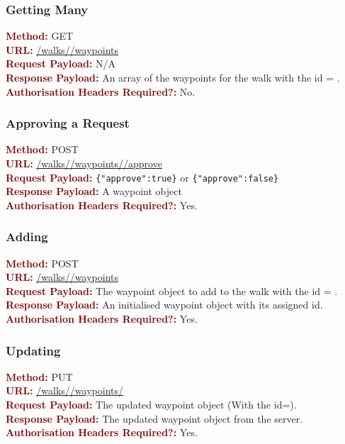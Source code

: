 \documentclass[11pt,a4paper]{report}
\begin{document}
\subsubsection{Getting Many}
\textbf{\textcolor{Maroon}{Method:}} GET\\
\textbf{\textcolor{Maroon}{URL:}} \url{/walks/}\url{/waypoints}\\
\textbf{\textcolor{Maroon}{Request Payload:}} N/A\\
\textbf{\textcolor{Maroon}{Response Payload:}} An array of the waypoints for the walk with the id = .\\
\textbf{\textcolor{Maroon}{Authorisation Headers Required?:}} No.

\subsubsection{Approving a Request}
\textbf{\textcolor{Maroon}{Method:}} POST\\
\textbf{\textcolor{Maroon}{URL:}} \url{/walks/}\url{/waypoints/}\url{/approve}\\
\textbf{\textcolor{Maroon}{Request Payload:}} \lstinline${"approve":true}$ or \lstinline${"approve":false}$\\
\textbf{\textcolor{Maroon}{Response Payload:}} A waypoint object\\
\textbf{\textcolor{Maroon}{Authorisation Headers Required?:}} Yes.

\subsubsection{Adding}
\textbf{\textcolor{Maroon}{Method:}} POST\\
\textbf{\textcolor{Maroon}{URL:}} \url{/walks/}\url{/waypoints}\\
\textbf{\textcolor{Maroon}{Request Payload:}} The waypoint object to add to the walk with the id = .\\
\textbf{\textcolor{Maroon}{Response Payload:}} An initialised waypoint object with its assigned id.\\
\textbf{\textcolor{Maroon}{Authorisation Headers Required?:}} Yes.

\subsubsection{Updating}
\textbf{\textcolor{Maroon}{Method:}} PUT\\
\textbf{\textcolor{Maroon}{URL:}} \url{/walks/}\url{/waypoints/}\\
\textbf{\textcolor{Maroon}{Request Payload:}} The updated waypoint object (With the id=).\\
\textbf{\textcolor{Maroon}{Response Payload:}} The updated waypoint object from the server.\\
\textbf{\textcolor{Maroon}{Authorisation Headers Required?:}} Yes.
\end{document}

